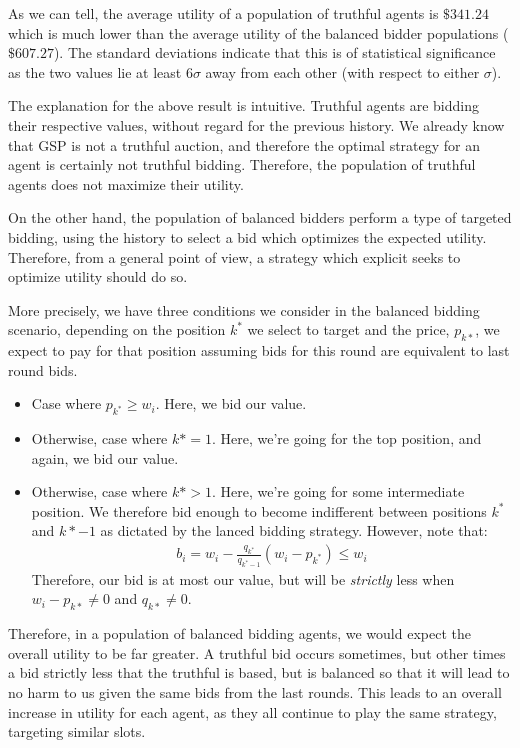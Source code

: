 \documentclass[11pt]{article}
\begin{document}
\begin{enumerate}
\begin{enumerate}
    As we can tell, the average utility of a population of truthful agents is $\$341.24$ which is much lower than the average utility of the balanced bidder populations ($\$607.27$). The standard deviations indicate that this is of statistical significance as the two values lie at least $6\sigma$ away from each other (with respect to either $\sigma$).

    The explanation for the above result is intuitive. Truthful agents are bidding their respective values, without regard for the previous history. We already know that GSP is not a truthful auction, and therefore the optimal strategy for an agent is certainly not truthful bidding. Therefore, the population of truthful agents does not maximize their utility. 

    On the other hand, the population of balanced bidders perform a type of targeted bidding, using the history to select a bid which optimizes the expected utility. Therefore, from a general point of view, a strategy which explicit seeks to optimize utility should do so.

    More precisely, we have three conditions we consider in the balanced bidding scenario, depending on the position $k^*$ we select to target and the price, $p_{k*}$, we expect to pay for that position assuming bids for this round are equivalent to last round bids. 

    \begin{itemize}
      \item Case where $p_{k^*} \geq w_i$. Here, we bid our value. 
      \item Otherwise, case where $k* = 1$. Here, we're going for the top position, and again, we bid our value.
      \item Otherwise, case where $k* > 1$. Here, we're going for some intermediate position. We therefore bid enough to become indifferent between positions $k^*$ and $k*-1$ as dictated by the lanced bidding strategy. However, note that:
      \begin{align*}
        b_i = w_i - \frac{q_{k^*}}{q_{k^{*}-1}}(w_i - p_{k^*}) \leq w_i
      \end{align*}
      Therefore, our bid is at most our value, but will be {\it strictly} less when $w_{i} - p_{k*} \neq 0$ and $q_{k*} \neq 0$.
    \end{itemize}
    Therefore, in a population of balanced bidding agents, we would expect the overall utility to be far greater. A truthful bid occurs sometimes, but other times a bid strictly less that the truthful is based, but is balanced so that it will lead to no harm to us given the same bids from the last rounds. This leads to an overall increase in utility for each agent, as they all continue to play the same strategy, targeting similar slots.


\end{enumerate}
\end{enumerate}
\end{document}
